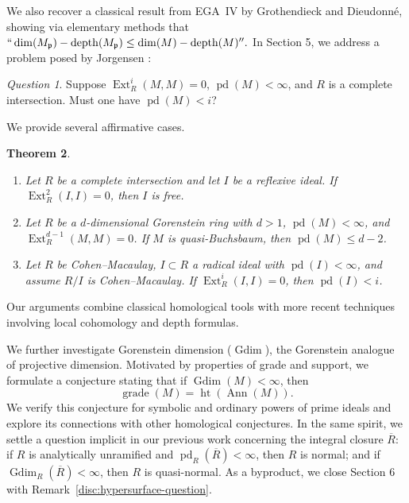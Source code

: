 \documentclass[11.05pt,a4paper]{amsart}
\newtheorem{theorem}{Theorem}[section]
\theoremstyle{definition}
\theoremstyle{remark}
\newtheorem{question}[theorem]{Question}
\newcommand{\pd}{\operatorname{pd}}
\newcommand{\Ext}{\operatorname{Ext}}
\newcommand{\depth}{\operatorname{depth}}
\begin{document}
We also recover a classical result from EGA~IV by Grothendieck and Dieudonné, showing via elementary methods that
\( ``
\dim(M_{\mathfrak{p}}) - \depth(M_{\mathfrak{p}})
\le
\dim(M) - \depth(M)''.
\)
In Section 5, we address a problem posed by Jorgensen \cite[Question 2.7]{Jo}:

\begin{question}
	Suppose \( \Ext^i_R(M,M) = 0 \), \( \pd(M) < \infty \), and \( R \) is a complete intersection. Must one have \( \pd(M) < i \)?
\end{question}

We provide several affirmative cases.

\begin{theorem}\label{1.4}
	\begin{enumerate}
		\item
		Let \( R \) be a complete intersection and let \( I \) be a reflexive ideal. If \( \Ext^2_R(I,I) = 0 \), then \( I \) is free.
		
		\item
		Let \( R \) be a \( d \)-dimensional Gorenstein ring with \( d>1 \), \( \pd(M) < \infty \), and \( \Ext^{d-1}_R(M,M)=0 \). If \( M \) is quasi-Buchsbaum, then \( \pd(M) \le d-2 \).
		
		\item
		Let \( R \) be Cohen--Macaulay, \( I \subset R \) a radical ideal with \( \pd(I) < \infty \), and assume \( R/I \) is Cohen--Macaulay. If \( \Ext^i_R(I,I) = 0 \), then \( \pd(I) < i \).
	\end{enumerate}
\end{theorem}

Our arguments combine classical homological tools with more recent techniques involving local cohomology and depth formulas.

We further investigate Gorenstein dimension (\( \operatorname{Gdim} \)), the Gorenstein analogue of projective dimension. Motivated by properties of grade and support, we formulate a conjecture stating that if \( \operatorname{Gdim}(M) < \infty \), then
\[
\operatorname{grade}(M) = \operatorname{ht}(\operatorname{Ann}(M)).
\]
We verify this conjecture for symbolic and ordinary powers of prime ideals and explore its connections with other homological conjectures. In the same spirit, we settle a question implicit in our previous work \cite{elham} concerning the integral closure \( \overline{R} \): if \( R \) is analytically unramified and \( \pd_R(\overline{R}) < \infty \), then \( R \) is normal; and if \( \operatorname{Gdim}_R(\overline{R}) < \infty \), then \( R \) is quasi-normal. As a byproduct, we close Section 6 with Remark~\ref{disc:hypersurface-question}.
\end{document}
